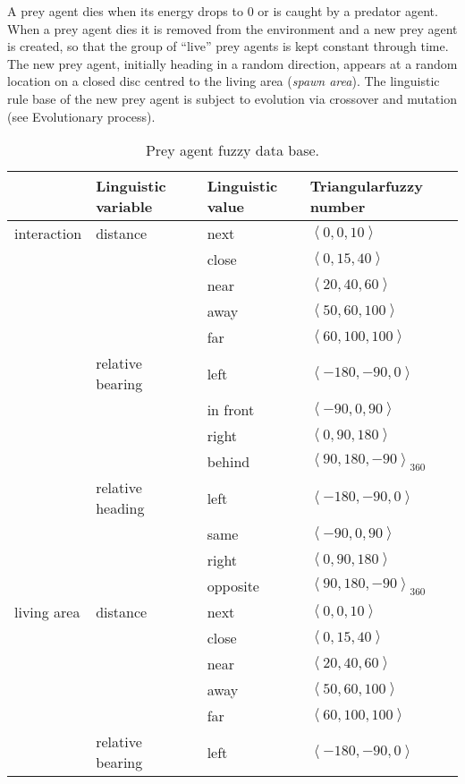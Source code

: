 A prey agent dies when its energy drops to 0 or is caught by a predator agent. When a prey agent dies it is removed from the environment and a new prey agent is created, so that the group of ``live'' prey agents is kept constant through time. The new prey agent, initially heading in a random direction, appears at a random location on a closed disc centred to the living area (\emph{spawn area}). The linguistic rule base of the new prey agent is subject to evolution via crossover and mutation (see Evolutionary process).

\begin{table}
  \caption{Prey agent fuzzy data base.}
  \label{tab:preyDB}
  \begin{tabular}{lllp{2.7cm}}
    \toprule
    & Linguistic variable & Linguistic value & Triangular\newline fuzzy number \\
    \midrule
    interaction & distance & next & $\left<0,0,10\right>$ \\
    & & close & $\left<0,15,40\right>$ \\
    & & near & $\left<20,40,60\right>$ \\
    & & away & $\left<50,60,100\right>$ \\
    & & far & $\left<60,100,100\right>$ \\
    & relative bearing & left & $\left<-180,-90,0\right>$ \\
    & & in front & $\left<-90,0,90\right>$ \\
    & & right & $\left<0,90,180\right>$ \\
    & & behind & $\left<90,180,-90\right>_{360}$ \\
    & relative heading & left & $\left<-180,-90,0\right>$ \\
    & & same & $\left<-90,0,90\right>$ \\
    & & right & $\left<0,90,180\right>$ \\
    & & opposite & $\left<90,180,-90\right>_{360}$ \\
    \hdashline
    living area & distance & next & $\left<0,0,10\right>$ \\
    & & close & $\left<0,15,40\right>$ \\
    & & near & $\left<20,40,60\right>$ \\
    & & away & $\left<50,60,100\right>$ \\
    & & far & $\left<60,100,100\right>$ \\
    & relative bearing & left & $\left<-180,-90,0\right>$ \\

\end{tabular}
\end{table}
